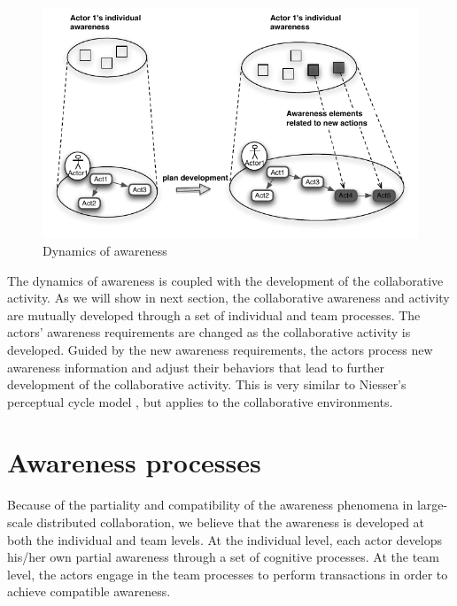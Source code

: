 \begin{figure}[htbp] %
   \centering
   \includegraphics{dynamics_of_awareness.pdf} 
   \caption{Dynamics of awareness}
   \label{fig:dynamics_of_awareness}
\end{figure}

The dynamics of awareness is coupled with the development of the collaborative activity. As we will show in next section, the collaborative awareness and activity are mutually developed through a set of individual and team processes. The actors' awareness requirements are changed as the collaborative activity is developed. Guided by the new awareness requirements, the actors process new awareness information and adjust their behaviors that lead to further development of the collaborative activity. This is very similar to Niesser's perceptual cycle model \cite{neisser1976cognition}, but applies to the collaborative environments.

\section{Awareness processes} %
\label{sec:awareness_processes}
Because of the partiality and compatibility of the awareness phenomena in large-scale distributed collaboration, we believe that the awareness is developed at both the individual and team levels. At the individual level, each actor develops his/her own partial awareness through a set of cognitive processes. At the team level, the actors engage in the team processes to perform transactions in order to achieve compatible awareness. 

